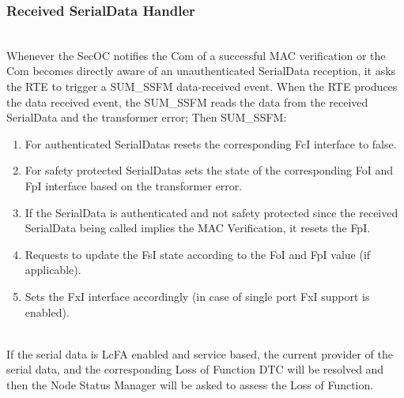 \subsubsection{Received SerialData Handler}
\\
\label{sec:ReceivedSerialDataDynamic}
Whenever the SecOC notifies the Com of a successful MAC verification or the Com becomes directly aware of an unauthenticated SerialData reception, it asks the RTE to trigger a SUM\_SSFM data-received event. 
When the RTE produces the data received event, the SUM\_SSFM reads the data from the received SerialData and the transformer error; Then SUM\_SSFM:
\begin{enumerate}
    \item For authenticated SerialDatas resets the corresponding FcI interface to false.
    \item For safety protected SerialDatas sets the state of the corresponding FoI and FpI interface based on the transformer error.
    \item If the SerialData is authenticated and not safety protected since the received SerialData being called implies the MAC Verification, it resets the FpI.
    \item Requests to update the FsI state according to the FoI and FpI value (if applicable).
    \item Sets the FxI interface accordingly (in case of single port FxI support is enabled).
\end{enumerate}
    
{}

\\
If the serial data is LcFA enabled and service based, the current provider of the serial data, and the corresponding Loss of Function DTC
will be resolved and then the Node Status Manager will be asked to assess the Loss of Function. 
\\
{}

